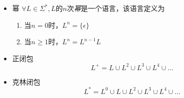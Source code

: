 \begin{itemize}
	\item 幂
	$\forall L\in\Sigma^{\ast},L$的$n$次\emph{幂}是一个语言，该语言定义为
	\begin{enumerate}
		\item 当$n=0$时，$L^n=\{\epsilon\}$
		\item 当$n\ge 1$时，$L^n=L^{n-1}L$
	\end{enumerate}
	\item 正闭包
	\[L^+=L\cup L^2\cup L^3\cup L^4 \cup\dots\]
	\item 克林闭包
	\[L^{\ast}=L^0\cup L\cup L^2\cup L^3\cup L^4 \cup\dots\]
\end{itemize}


